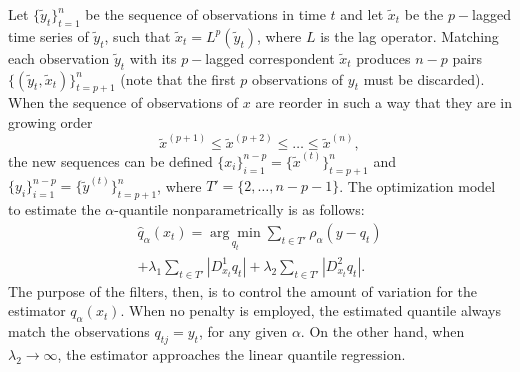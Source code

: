 Let $\{\tilde{y}_t \}_{t=1}^n$ be the sequence of observations in time $t$ and let $\tilde{x}_t$ be the $p-$lagged time series of $\tilde{y}_t$, such that $\tilde{x}_t = L^p(\tilde{y}_t)$, where $L$ is the lag operator. Matching each observation $\tilde{y}_t$ with its $p-$lagged correspondent $\tilde{x}_t$ produces $n-p$ pairs $\{(\tilde{y}_t,\tilde{x}_t)\}_{t=p+1}^n$ (note that the first $p$ observations of $y_t$ must be discarded). When the sequence of observations of $x$ are reorder in such a way that they are in growing order
$$\tilde{x}^{(p+1)} \leq \tilde{x}^{(p+2)} \leq \dots \leq \tilde{x}^{(n)},$$ 
the new sequences can be defined $\{x_i\}_{i=1}^{n-p} = \{\tilde{x}^{(t)} \}_{t=p+1}^{n}$ and $\{y_i\}_{i=1}^{n-p} = \{\tilde{y}^{(t)} \}_{t=p+1}^{n}$, where $T' = \{2,\dots, n-p-1\}$. 
The optimization model to estimate the $\alpha$-quantile nonparametrically is as follows:
\begin{equation}
\begin{split}
\hat{q}_{\alpha}(x_t) =\underset{q_{t}}{\arg\min}\sum_{t\in T'} \rho_{\alpha} \left( y - q_{t} \right) \\ +\lambda_1  \sum_{t\in T'}|D_{x_t}^{1}q_{t}| +\lambda_2  \sum_{t\in T'}|D_{x_t}^{2}q_{t}|.
\end{split}
\end{equation}
The purpose of the filters, then, is to control the amount of variation for the estimator $q_\alpha(x_t)$. When no penalty is employed, the estimated quantile always match the observations $q_{tj} = y_t$, for any given $\alpha$. On the other hand, when $\lambda_2 \rightarrow \infty$, the estimator approaches the linear quantile regression. 






